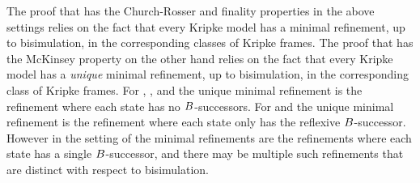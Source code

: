 The proof that \logicRml{} has the Church-Rosser and finality properties in the above settings relies on the fact that every Kripke model has a minimal refinement, up to bisimulation, in the corresponding classes of Kripke frames.
The proof that \logicRml{} has the McKinsey property on the other hand relies on the fact that every Kripke model has a {\em unique} minimal refinement, up to bisimulation, in the corresponding class of Kripke frames.
For \classK{}, \classKF{}, and \classKFF{} the unique minimal refinement is the refinement where each state has no $B$-successors.
For \classSF{} and \classS{} the unique minimal refinement is the refinement where each state only has the reflexive $B$-successor.
However in the setting of \classKD{} the minimal refinements are the refinements where each state has a single $B$-successor, and there may be multiple such refinements that are distinct with respect to bisimulation.

